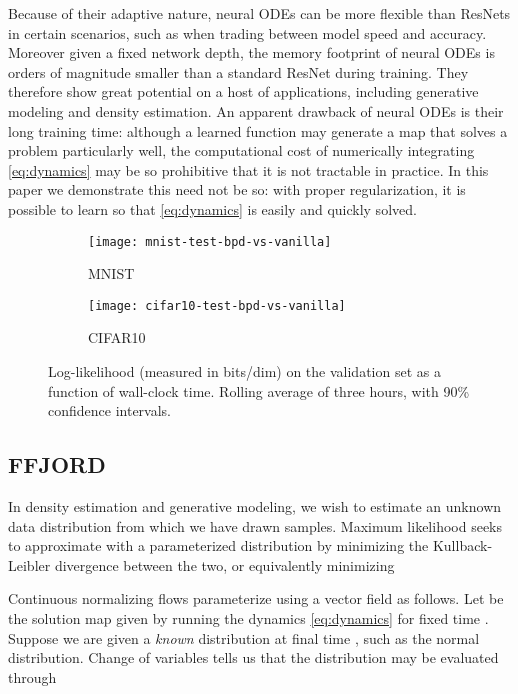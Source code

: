 \documentclass{article}
\theoremstyle{definition}
\theoremstyle{remark}
\begin{document}
Because of their adaptive nature, neural ODEs can be more flexible than ResNets in certain scenarios, such as when trading between model speed and accuracy. Moreover given a fixed
network depth, the memory footprint of neural ODEs is orders of magnitude
smaller than a standard ResNet during training. They therefore show great
potential on a host
of applications, including generative modeling and density estimation. 
An apparent drawback of neural ODEs is their long training time: although a
learned function  may generate a map that solves a problem
particularly well, the computational cost of numerically integrating
\eqref{eq:dynamics} may be so prohibitive that it is not tractable in practice. 
In this paper we demonstrate this need not be so: with proper regularization, it is possible to learn  so that \eqref{eq:dynamics} is easily and quickly solved.
\begin{figure*}[ht]
  \vskip 0.2in
    \centering
    \begin{subfigure}[t]{.45\textwidth}
      \texttt{[image: mnist-test-bpd-vs-vanilla]}
    \caption{MNIST}\label{fig:bpd-mnist}
    \end{subfigure}
\begin{subfigure}[t]{.45\textwidth}
      \texttt{[image: cifar10-test-bpd-vs-vanilla]}
    \caption{CIFAR10}\label{fig:bpd-cifar10}
  \end{subfigure}
  \caption{Log-likelihood (measured in bits/dim) on the validation set as a function of wall-clock time. Rolling
average of three hours, with 90\% confidence intervals.}\label{fig:bpd}
\end{figure*}


\subsection{FFJORD}
In density estimation and generative modeling, we wish to estimate an unknown data distribution  from which
we have drawn 
samples. Maximum likelihood seeks to approximate  with a parameterized
distribution  by minimizing the Kullback-Leibler divergence between the two, or
equivalently minimizing

Continuous normalizing flows \citep{grathwohl_ffjord,chen2018neural} parameterize  using a vector field
 as follows. 
Let  be the solution map given by running the dynamics
\eqref{eq:dynamics}
for fixed time .
Suppose we are given a \emph{known} distribution  at final time ,
such as the normal distribution. Change of variables tells us that the
distribution  may be evaluated through
\end{document}
